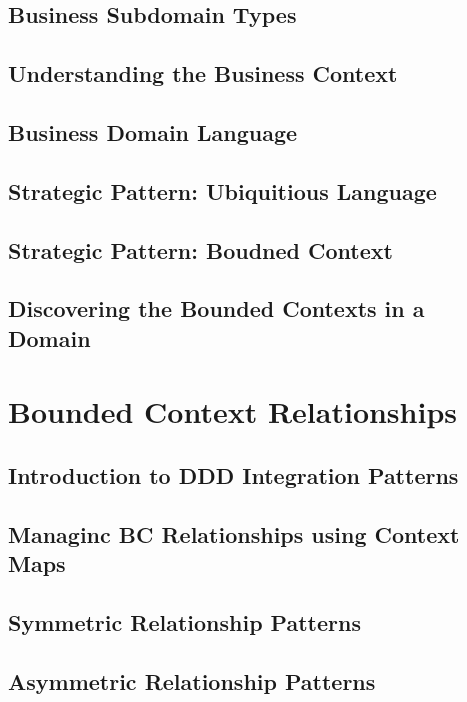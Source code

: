 \documentclass[a4paper, 11pt]{book}
\begin{document}
    \section{Business Subdomain Types}


    \section{Understanding the Business Context}


    \section{Business Domain Language}


    \section{Strategic Pattern: Ubiquitious Language}


    \section{Strategic Pattern: Boudned Context}


    \section{Discovering the Bounded Contexts in a Domain}


    \chapter{Bounded Context Relationships}


    \section{Introduction to DDD Integration Patterns}


    \section{Managinc BC Relationships using Context Maps}


    \section{Symmetric Relationship Patterns}


    \section{Asymmetric Relationship Patterns}
\end{document}
